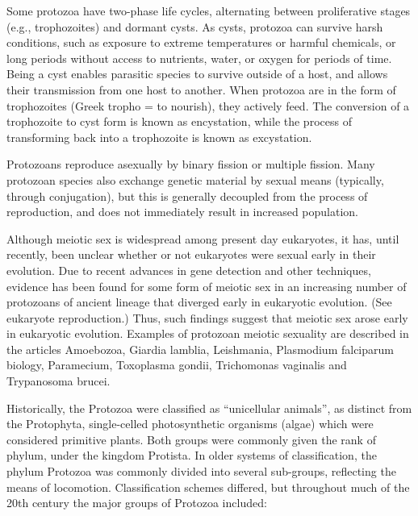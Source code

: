 Some protozoa have two-phase life cycles, alternating between proliferative stages (e.g., trophozoites) and dormant cysts. As cysts, protozoa can survive harsh conditions, such as exposure to extreme temperatures or harmful chemicals, or long periods without access to nutrients, water, or oxygen for periods of time. Being a cyst enables parasitic species to survive outside of a host, and allows their transmission from one host to another. When protozoa are in the form of trophozoites (Greek tropho = to nourish), they actively feed. The conversion of a trophozoite to cyst form is known as encystation, while the process of transforming back into a trophozoite is known as excystation.

Protozoans reproduce asexually by binary fission or multiple fission. Many protozoan species also exchange genetic material by sexual means (typically, through conjugation), but this is generally decoupled from the process of reproduction, and does not immediately result in increased population.

Although meiotic sex is widespread among present day eukaryotes, it has, until recently, been unclear whether or not eukaryotes were sexual early in their evolution. Due to recent advances in gene detection and other techniques, evidence has been found for some form of meiotic sex in an increasing number of protozoans of ancient lineage that diverged early in eukaryotic evolution. (See eukaryote reproduction.) Thus, such findings suggest that meiotic sex arose early in eukaryotic evolution. Examples of protozoan meiotic sexuality are described in the articles Amoebozoa, Giardia lamblia, Leishmania, Plasmodium falciparum biology, Paramecium, Toxoplasma gondii, Trichomonas vaginalis and Trypanosoma brucei.

Historically, the Protozoa were classified as ``unicellular animals'', as distinct from the Protophyta, single-celled photosynthetic organisms (algae) which were considered primitive plants. Both groups were commonly given the rank of phylum, under the kingdom Protista. In older systems of classification, the phylum Protozoa was commonly divided into several sub-groups, reflecting the means of locomotion. Classification schemes differed, but throughout much of the 20th century the major groups of Protozoa included:

